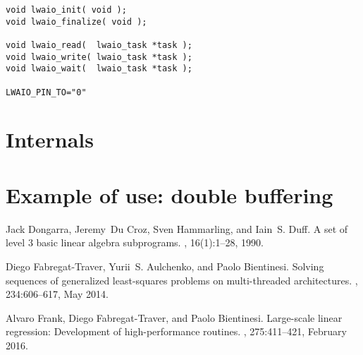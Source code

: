 \documentclass[a4paper,10pt]{article}
\begin{document}
\begin{verbatim}
void lwaio_init( void );
void lwaio_finalize( void );

void lwaio_read(  lwaio_task *task );
void lwaio_write( lwaio_task *task );
void lwaio_wait(  lwaio_task *task );

LWAIO_PIN_TO="0"
\end{verbatim}

\section{Internals}



\section{Example of use: double buffering}

%
%
\begin{thebibliography}{1}

Jack Dongarra, Jeremy~Du Croz, Sven Hammarling, and Iain~S. Duff.
\newblock A set of level 3 basic linear algebra subprograms.
, 16(1):1--28, 1990.

Diego Fabregat-Traver, Yurii~S. Aulchenko, and Paolo Bientinesi.
\newblock Solving sequences of generalized least-squares problems on
  multi-threaded architectures.
, 234:606--617, May
  2014.

Alvaro Frank, Diego Fabregat-Traver, and Paolo Bientinesi.
\newblock Large-scale linear regression: Development of high-performance
  routines.
, 275:411--421, February
  2016.

\end{thebibliography}
\end{document}
